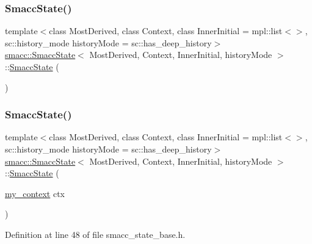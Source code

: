 \subsubsection{\texorpdfstring{Smacc\+State()}{SmaccState()}\hspace{0.1cm}{\footnotesize\ttfamily [1/2]}}
{\footnotesize\ttfamily template$<$class Most\+Derived, class Context, class Inner\+Initial = mpl\+::list$<$$>$, sc\+::history\+\_\+mode history\+Mode = sc\+::has\+\_\+deep\+\_\+history$>$ \\
\hyperlink{classsmacc_1_1SmaccState}{smacc\+::\+Smacc\+State}$<$ Most\+Derived, Context, Inner\+Initial, history\+Mode $>$\+::\hyperlink{classsmacc_1_1SmaccState}{Smacc\+State} (\begin{DoxyParamCaption}{ }\end{DoxyParamCaption})\hspace{0.3cm}{\ttfamily [delete]}}

\mbox{\label{classsmacc_1_1SmaccState_adc225018fe91da47e6e9f1d20150b26a}} 
\subsubsection{\texorpdfstring{Smacc\+State()}{SmaccState()}\hspace{0.1cm}{\footnotesize\ttfamily [2/2]}}
{\footnotesize\ttfamily template$<$class Most\+Derived, class Context, class Inner\+Initial = mpl\+::list$<$$>$, sc\+::history\+\_\+mode history\+Mode = sc\+::has\+\_\+deep\+\_\+history$>$ \\
\hyperlink{classsmacc_1_1SmaccState}{smacc\+::\+Smacc\+State}$<$ Most\+Derived, Context, Inner\+Initial, history\+Mode $>$\+::\hyperlink{classsmacc_1_1SmaccState}{Smacc\+State} (\begin{DoxyParamCaption}\item[{\hyperlink{structsmacc_1_1SmaccState_1_1my__context}{my\+\_\+context}}]{ctx }\end{DoxyParamCaption})\hspace{0.3cm}{\ttfamily [inline]}}



Definition at line 48 of file smacc\+\_\+state\+\_\+base.\+h.


